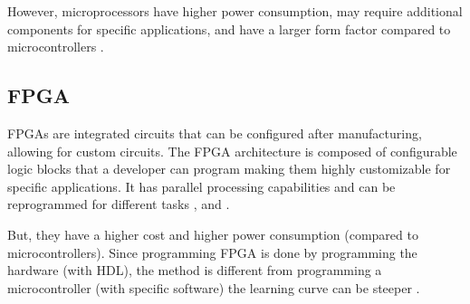 However, microprocessors have higher power consumption, may require additional components for specific applications, and have a larger form factor compared to microcontrollers \cite{OBC5}.

\subsection{FPGA}
\glspl{FPGA} are integrated circuits that can be configured after manufacturing, allowing for custom circuits.
The \gls{FPGA} architecture is composed of configurable logic blocks that a developer can program making them highly customizable for specific applications.
It has parallel processing capabilities and can be reprogrammed for different tasks \cite{OBC1}, \cite{OBC3} and \cite{OBC5}.

But, they have a higher cost and higher power consumption (compared to microcontrollers).
Since programming \gls{FPGA} is done by programming the hardware (with \gls{HDL}), the method is different from programming a microcontroller (with specific software) the learning curve can be steeper \cite{OBC1} \cite{OBC3}.

